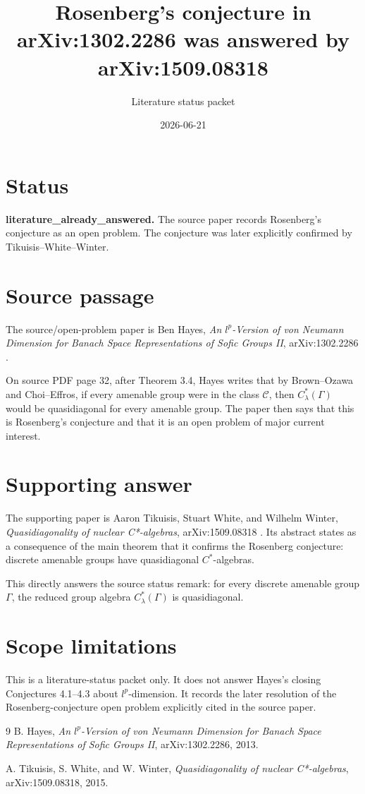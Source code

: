 \documentclass[11pt]{article}
\title{Rosenberg's conjecture in arXiv:1302.2286 was answered by arXiv:1509.08318}
\author{Literature status packet}
\date{2026-06-21}
\begin{document}
\maketitle

\section*{Status}

\textbf{literature\_already\_answered.}  The source paper records Rosenberg's
conjecture as an open problem.  The conjecture was later explicitly confirmed
by Tikuisis--White--Winter.

\section*{Source passage}

The source/open-problem paper is Ben Hayes,
\emph{An \(l^p\)-Version of von Neumann Dimension for Banach Space
Representations of Sofic Groups II}, arXiv:1302.2286 \cite{Hayes}.

On source PDF page 32, after Theorem 3.4, Hayes writes that by Brown--Ozawa
and Choi--Effros, if every amenable group were in the class \(\mathcal C\), then
\(C^*_\lambda(\Gamma)\) would be quasidiagonal for every amenable group.  The
paper then says that this is Rosenberg's conjecture and that it is an open
problem of major current interest.

\section*{Supporting answer}

The supporting paper is Aaron Tikuisis, Stuart White, and Wilhelm Winter,
\emph{Quasidiagonality of nuclear C*-algebras}, arXiv:1509.08318 \cite{TWW}.
Its abstract states as a consequence of the main theorem that it confirms the
Rosenberg conjecture: discrete amenable groups have quasidiagonal
\(C^*\)-algebras.

This directly answers the source status remark: for every discrete amenable
group \(\Gamma\), the reduced group algebra \(C^*_\lambda(\Gamma)\) is
quasidiagonal.

\section*{Scope limitations}

This is a literature-status packet only.  It does not answer Hayes's closing
Conjectures 4.1--4.3 about \(l^p\)-dimension.  It records the later resolution
of the Rosenberg-conjecture open problem explicitly cited in the source paper.

\begin{thebibliography}{9}
B. Hayes,
\emph{An \(l^p\)-Version of von Neumann Dimension for Banach Space
Representations of Sofic Groups II},
arXiv:1302.2286, 2013.

A. Tikuisis, S. White, and W. Winter,
\emph{Quasidiagonality of nuclear C*-algebras},
arXiv:1509.08318, 2015.
\end{thebibliography}
\end{document}
